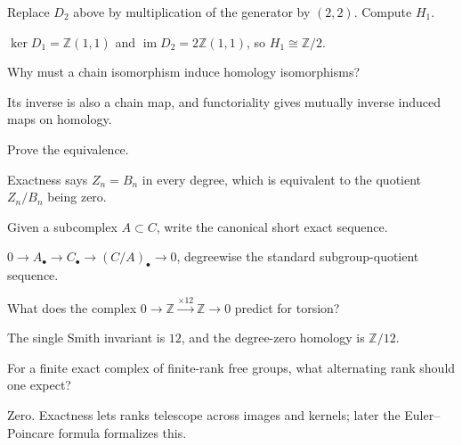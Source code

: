 \begin{problem}\label{prob:viii16-16}
Replace \(D_2\) above by multiplication of the generator by \((2,2)\). Compute \(H_1\).
\end{problem}
\begin{solution}
\(\ker D_1=\mathbb Z(1,1)\) and \(\operatorname{im}D_2=2\mathbb Z(1,1)\), so \(H_1\cong\mathbb Z/2\).
\end{solution}

\begin{problem}\label{prob:viii16-17}
Why must a chain isomorphism induce homology isomorphisms?
\end{problem}
\begin{solution}
Its inverse is also a chain map, and functoriality gives mutually inverse induced maps on homology.
\end{solution}

\begin{problem}\label{prob:viii16-18}
Prove the equivalence.
\end{problem}
\begin{solution}
Exactness says \(Z_n=B_n\) in every degree, which is equivalent to the quotient \(Z_n/B_n\) being zero.
\end{solution}

\begin{problem}\label{prob:viii16-19}
Given a subcomplex \(A\subset C\), write the canonical short exact sequence.
\end{problem}
\begin{solution}
\(0\to A_\bullet\to C_\bullet\to(C/A)_\bullet\to0\), degreewise the standard subgroup-quotient sequence.
\end{solution}

\begin{problem}\label{prob:viii16-20}
What does the complex \(0\to\mathbb Z\xrightarrow{\times12}\mathbb Z\to0\) predict for torsion?
\end{problem}
\begin{solution}
The single Smith invariant is \(12\), and the degree-zero homology is \(\mathbb Z/12\).
\end{solution}

\begin{problem}\label{prob:viii16-21}
For a finite exact complex of finite-rank free groups, what alternating rank should one expect?
\end{problem}
\begin{solution}
Zero. Exactness lets ranks telescope across images and kernels; later the Euler--Poincare formula formalizes this.
\end{solution}

